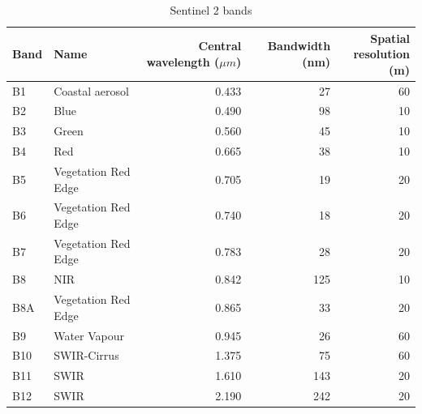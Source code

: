\documentclass[../main.tex]{subfiles}
\begin{document}
\begin{table}[H]
	\centering
	\caption{Sentinel 2 bands}
	\label{tab:sentinel2-bands}
	\begin{tabular}{llrrr}
		\hline
		Band & Name                & \parbox{3cm}{\centering \vspace{0.5cm} Central \\ wavelength ($\mu m$) \\ \hspace{0.1cm}} & Bandwidth (nm) & \parbox{3cm}{\centering Spatial\\ resolution (m)} \\ \hline
		B1   & Coastal aerosol     &                      $0.433$ &             27 &                     60 \\
		B2   & Blue                &                        0.490 &             98 &                     10 \\
		B3   & Green               &                        0.560 &             45 &                     10 \\
		B4   & Red                 &                        0.665 &             38 &                     10 \\
		B5   & Vegetation Red Edge &                        0.705 &             19 &                     20 \\
		B6   & Vegetation Red Edge &                        0.740 &             18 &                     20 \\
		B7   & Vegetation Red Edge &                        0.783 &             28 &                     20 \\
		B8   & NIR                 &                        0.842 &            125 &                     10 \\
		B8A  & Vegetation Red Edge &                        0.865 &             33 &                     20 \\
		B9   & Water Vapour        &                        0.945 &             26 &                     60 \\
		B10  & SWIR-Cirrus         &                        1.375 &             75 &                     60 \\
		B11  & SWIR                &                        1.610 &            143 &                     20 \\
		B12  & SWIR                &                        2.190 &            242 &                     20\\\hline
	\end{tabular}
\end{table}
\end{document}
